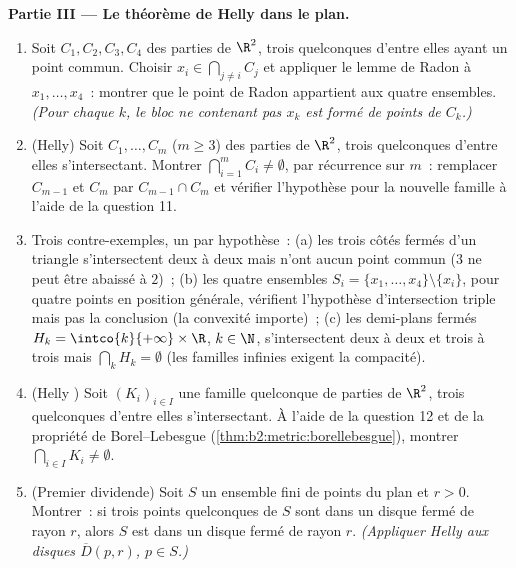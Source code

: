\begin{problem}
\medskip
\noindent\textbf{Partie III --- Le théorème de Helly dans le plan.}
\begin{enumerate}[resume]
  \item Soit $C_1, C_2, C_3, C_4$ des parties  de $\R^2$,
        trois quelconques d'entre elles ayant un point commun. Choisir
        $x_i \in \bigcap_{j \neq i} C_j$ et appliquer le lemme de
        Radon à $x_1, \dots, x_4$~: montrer que le point de Radon
        appartient aux quatre ensembles. \emph{(Pour chaque $k$, le
        bloc ne contenant pas $x_k$ est formé de points de $C_k$.)}
  \item (Helly) Soit $C_1, \dots, C_m$ ($m \geq 3$) des parties
         de $\R^2$, trois quelconques d'entre elles
        s'intersectant. Montrer $\bigcap_{i=1}^m C_i \neq \emptyset$,
        par récurrence sur $m$~: remplacer $C_{m-1}$ et $C_m$ par
        $C_{m-1} \cap C_m$ et vérifier l'hypothèse pour la nouvelle
        famille à l'aide de la question 11.
  \item Trois contre-exemples, un par hypothèse~: (a) les
        trois côtés fermés d'un triangle s'intersectent deux à deux
        mais n'ont aucun point commun ($3$ ne peut être abaissé à
        $2$)~; (b) les quatre ensembles $S_i = \{x_1, \dots, x_4\}
        \setminus \{x_i\}$, pour quatre points en position
        générale, vérifient l'hypothèse d'intersection triple mais pas
        la conclusion (la convexité importe)~; (c) les demi-plans
        fermés $H_k = \intco{k}{+\infty} \times
        \R$, $k \in \N$, s'intersectent deux à deux et trois à trois
        mais $\bigcap_k H_k = \emptyset$ (les familles infinies
        exigent la compacité).
  \item (Helly ) Soit $(K_i)_{i \in I}$ une famille
        quelconque de parties   de $\R^2$, trois
        quelconques d'entre elles s'intersectant. À l'aide de la
        question 12 et de la propriété de Borel--Lebesgue
        (\cref{thm:b2:metric:borellebesgue}), montrer
        $\bigcap_{i \in I} K_i \neq \emptyset$.
  \item (Premier dividende) Soit $S$ un ensemble fini de points du
        plan et $r > 0$. Montrer~: si trois points quelconques de
        $S$ sont dans un disque fermé de rayon $r$, alors $S$
        est dans un disque fermé de rayon $r$. \emph{(Appliquer
        Helly aux disques $\overline D(p, r)$, $p \in S$.)}
\end{enumerate}


\end{problem}
